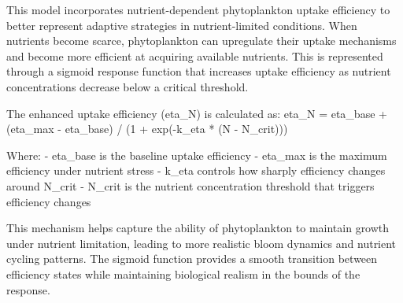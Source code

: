 This model incorporates nutrient-dependent phytoplankton uptake efficiency to better represent adaptive strategies in nutrient-limited conditions. When nutrients become scarce, phytoplankton can upregulate their uptake mechanisms and become more efficient at acquiring available nutrients. This is represented through a sigmoid response function that increases uptake efficiency as nutrient concentrations decrease below a critical threshold.

The enhanced uptake efficiency (eta_N) is calculated as:
eta_N = eta_base + (eta_max - eta_base) / (1 + exp(-k_eta * (N - N_crit)))

Where:
- eta_base is the baseline uptake efficiency
- eta_max is the maximum efficiency under nutrient stress
- k_eta controls how sharply efficiency changes around N_crit
- N_crit is the nutrient concentration threshold that triggers efficiency changes

This mechanism helps capture the ability of phytoplankton to maintain growth under nutrient limitation, leading to more realistic bloom dynamics and nutrient cycling patterns. The sigmoid function provides a smooth transition between efficiency states while maintaining biological realism in the bounds of the response.
